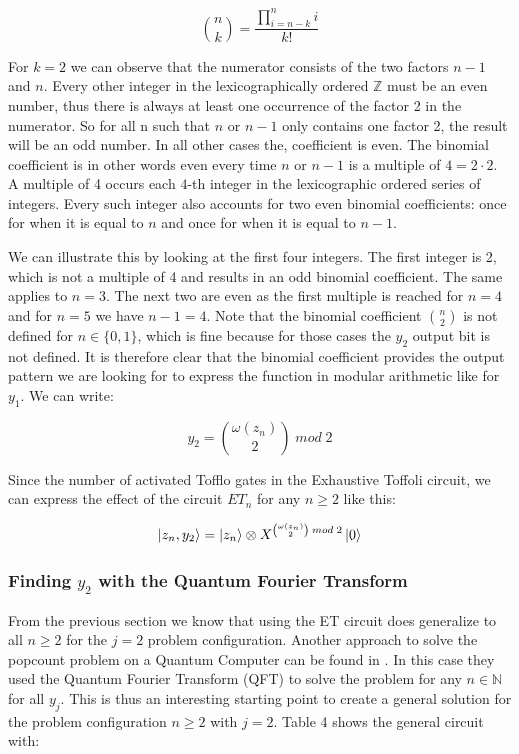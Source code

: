 \documentclass[12pt,a4paper]{article}
\begin{document}
\[\binom{n}{k} = \frac{\prod^{n}_{i = n-k}i}{k!}\]

For \(k=2\) we can observe that the numerator consists of the two factors \(n-1\) and \(n\). Every other integer in the lexicographically ordered \(\mathbb{Z}\) must be an even number, thus there is always at least one occurrence of the factor 2 in the numerator. So for all n such that \(n\) or \(n-1\) only contains one factor 2, the result will be an odd number. In all other cases the, coefficient is even. The binomial coefficient is in other words even every time \(n\) or \(n-1\) is a multiple of \(4 = 2 \cdot 2\). A multiple of 4 occurs each \(4\)-th integer in the lexicographic ordered series of integers. Every such integer also accounts for two even binomial coefficients: once for when it is equal to \(n\) and once for when it is equal to \(n-1\). 

We can illustrate this by looking at the first four integers. The first integer is 2, which is not a multiple of 4 and results in an odd binomial coefficient. The same applies to \(n=3\). The next two are even as the first multiple is reached for \(n=4\) and for \(n=5\) we have \(n-1 = 4\). Note that the binomial coefficient \(\binom{n}{2}\) is not defined for \(n \in \{0,1\}\), which is fine because for those cases the \(y_2\) output bit is not defined. It is therefore clear that the binomial coefficient provides the output pattern we are looking for to express the function in modular arithmetic like for \(y_1\). We can write:

\[y_2 = \binom{\omega(z_n)}{2} \; mod \; 2\]

Since the number of activated Tofflo gates in the Exhaustive Toffoli circuit, we can express the effect of the circuit \(ET_n\) for any \(n \ge 2\) like this:

\[\ket{z_n, y_2} = \ket{z_n} \otimes X^{\binom{\omega(z_n)}{2} \; mod \; 2}\ket{0}\]

\subsubsection{Finding \(y_2\)  with the Quantum Fourier Transform}
From the previous section we know that using the ET circuit does generalize to all \(n \ge 2\) for the \(j=2\) problem configuration. Another approach to solve the popcount problem on a Quantum Computer can be found in \cite{mit_problem_set_2010}. In this case they used the Quantum Fourier Transform (QFT) to solve the problem for any \(n \in \mathbb{N}\) for all \(y_j\). This is thus an interesting starting point to create a general solution for the problem configuration \(n \ge 2\) with \(j = 2\). Table 4 shows the general circuit with:
\end{document}
